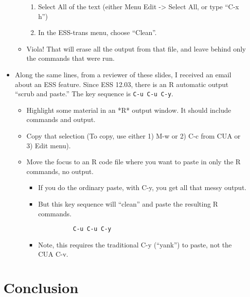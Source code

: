 \documentclass[11pt,english]{beamer}
\begin{document}
\begin{frame}
\begin{itemize}
\begin{itemize}
      \begin{enumerate}
      \item Select All of the text (either Menu Edit -> Select All, or type ``C-x
        h'')
      \item In the ESS-trans menu, choose ``Clean''.
      \end{enumerate}
    \item Viola! That will erase all the output from that file, and leave behind
      only the commands that were run.
    \end{itemize}
  \item Along the same lines, from a reviewer of these slides, I received
    an email about an ESS feature. Since ESS 12.03, there is an R automatic
    output ``scrub and paste.'' The key sequence is \lstinline!C-u C-u C-y!. 

    \begin{itemize}
    \item Highlight some material in an {*}R{*} output window. It should include
      commands and output.
    \item Copy that selection (To copy, use either 1) M-w or 2) C-c from CUA
      or 3) Edit menu).
    \item Move the focus to an R code file where you want to paste in only the
      R commands, no output. 

      \begin{itemize}
      \item If you do the ordinary paste, with C-y, you get all that messy output.
      \item But this key sequence will ``clean'' and paste the resulting R commands.


        \begin{lstlisting}
          C-u C-u C-y
        \end{lstlisting}


      \item Note, this requires the traditional C-y (``yank'') to paste, not
        the CUA C-v. 
      \end{itemize}
    \end{itemize}
  \end{itemize}
\end{frame}


\section{Conclusion}
\end{document}
